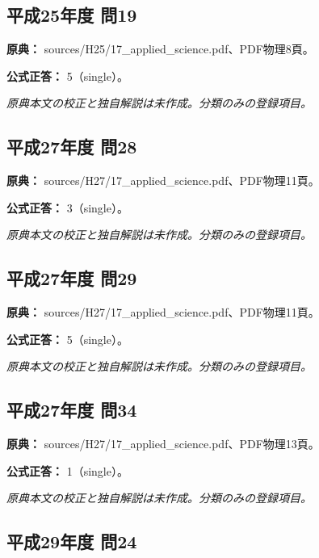 \subsection{平成25年度 問19}
\label{q:h25-reg-applied-19}

\noindent\textbf{原典：} sources/H25/17\_applied\_science.pdf、PDF物理8頁。

\textbf{公式正答：} 5（single）。

\par\textit{原典本文の校正と独自解説は未作成。分類のみの登録項目。}

\subsection{平成27年度 問28}
\label{q:h27-reg-applied-28}

\noindent\textbf{原典：} sources/H27/17\_applied\_science.pdf、PDF物理11頁。

\textbf{公式正答：} 3（single）。

\par\textit{原典本文の校正と独自解説は未作成。分類のみの登録項目。}

\subsection{平成27年度 問29}
\label{q:h27-reg-applied-29}

\noindent\textbf{原典：} sources/H27/17\_applied\_science.pdf、PDF物理11頁。

\textbf{公式正答：} 5（single）。

\par\textit{原典本文の校正と独自解説は未作成。分類のみの登録項目。}

\subsection{平成27年度 問34}
\label{q:h27-reg-applied-34}

\noindent\textbf{原典：} sources/H27/17\_applied\_science.pdf、PDF物理13頁。

\textbf{公式正答：} 1（single）。

\par\textit{原典本文の校正と独自解説は未作成。分類のみの登録項目。}

\subsection{平成29年度 問24}
\label{q:h29-reg-applied-24}

